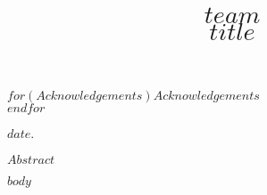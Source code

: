 \documentclass[mstat,12pt]{unswthesis}
\title{$team$\\[0.5cm]$title$}
\author{\Authornameonly}
\begin{document}
\begin{adjustwidth}{-2cm}{}

\beforepreface






{\bigskip}$for(Acknowledgements)$$Acknowledgements$\\[1cm] $endfor$

{\bigskip\bigskip\bigskip\noindent} $date$.




$Abstract$



\afterpreface





%
%






$body$





\end{adjustwidth}
\end{document}
